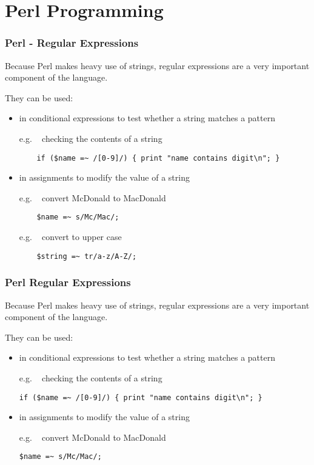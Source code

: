 

\section{Perl Programming}

\begin{frame}
\frametitle{Perl - Regular Expressions}
Because Perl makes heavy use of strings, regular expressions
are a very important component of the language.

They can be used:
\begin{itemize}
\item  in conditional expressions to test whether a string matches a pattern

e.g. ~ checking the contents of a string
\begin{verbatim}
    if ($name =~ /[0-9]/) { print "name contains digit\n"; }
\end{verbatim}

\item  in assignments to modify the value of a string

e.g. ~ convert McDonald to MacDonald
\begin{verbatim}
    $name =~ s/Mc/Mac/;
\end{verbatim}

e.g. ~ convert to upper case
\begin{verbatim}
    $string =~ tr/a-z/A-Z/;
\end{verbatim}


\end{itemize}
\end{frame}

\begin{frame}[fragile]
\frametitle{Perl Regular Expressions}
Because Perl makes heavy use of strings, regular expressions
are a very important component of the language.

They can be used:
\begin{itemize}
\item  in conditional expressions to test whether a string matches a pattern

e.g. ~ checking the contents of a string
\begin{verbatim}
if ($name =~ /[0-9]/) { print "name contains digit\n"; }
\end{verbatim}

\item  in assignments to modify the value of a string

e.g. ~ convert McDonald to MacDonald
\begin{verbatim}
$name =~ s/Mc/Mac/;
\end{verbatim}

\end{itemize}
\end{frame}

